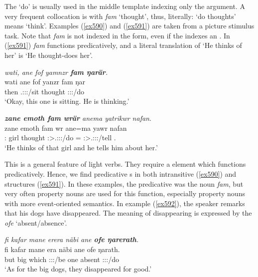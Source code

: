 The  `do' is usually used in the middle template indexing only the  argument. A very frequent collocation is with \emph{fam} `thought', thus, literally: `do thoughts' means `think'. Examples (\ref{ex590}) and (\ref{ex591}) are taken from a picture stimulus task. Note that \emph{fam} is not indexed in the  form, even if the  indexes an . In (\ref{ex591}) \emph{fam} functions predicatively, and a literal translation of `He thinks of her' is `He thought-does her'.

\begin{exe}
	\ex \emph{wati, ane fof yamnzr \textbf{fam ŋarär}.}\\
	\gll wati ane fof yanzr fam ŋar\\
	then \Dem{} \Emph{} \Tsg.\Masc:\Sbj:\Nonpast:\Ipfv/sit thought \Stsg:\Sbj:\Nonpast:\Ipfv/do\\
	\trans `Okay, this one is sitting. He is thinking.'
	\label{ex590}
\end{exe}
\begin{exe}
	\ex \emph{\textbf{zane emoth fam wrär} anema yatrikwr nafan}.\\
	\gll zane emoth fam wr ane=ma yawr nafan\\
	\Dem:\Prox{} girl thought \Stsg:\Sbj>\Tsg.\F:\Obj:\Nonpast:\Ipfv/do \Dem=\Char{} \Stsg:\Sbj>\Tsg.\Masc:\Io:\Nonpast:\Ipfv/tell \Tsg.\Dat\\
	\trans `He thinks of that girl and he tells him about her.'
	\label{ex591}
\end{exe}

This is a general feature of light verbs. They require a  element which functions predicatively. Hence, we find predicative s in both intransitive (\ref{ex590}) and  structures (\ref{ex591}). In these examples, the predicative  was the noun \emph{fam}, but very often property nouns are used for this function, especially property nouns with more event-oriented semantics. In example (\ref{ex592}), the speaker remarks that his dogs have disappeared. The meaning of disappearing is expressed by the  \emph{ofe} `absent/absence'.

\begin{exe}
	\ex \emph{fi kafar mane erera näbi ane \textbf{ofe ŋarerath}.}\\
	\gll fi kafar mane era näbi ane ofe ŋarath.\\
	but big which \Stpl:\Sbj:\Pst:\Ipfv/be one \Dem{} absent \Stpl:\Sbj:\Pst:\Ipfv/do\\
	\trans `As for the big dogs, they disappeared for good.'
	\label{ex592}
\end{exe}

